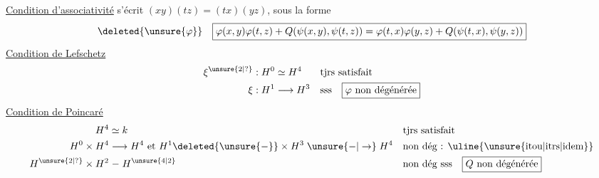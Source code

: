 \uline{Condition d'associativité} s'écrit $(xy)(tz)=(tx)(yz)$, sous la forme
\[
\deleted{\unsure{\varphi}}\quad
\boxed{\varphi(x,y)\varphi(t,z)+Q(\psi(x,y),\psi(t,z))=\varphi(t,x)\varphi(y,z)+Q(\psi(t,x),\psi(y,z))}
\]
\uline{Condition de Lefschetz}
\[
\begin{aligned}
\xi^{\unsure{2|?}}:H^0&\simeq H^4 &&\text{tjrs satisfait}\\
\xi:H^1&\longrightarrow H^3 &&\text{sss}\quad\boxed{\varphi\ \text{non dégénérée}}
\end{aligned}
\]
\uline{Condition de Poincaré}
\[
\begin{aligned}
H^4&\simeq k &&\text{tjrs satisfait}\\
H^0\times H^4&\longrightarrow H^4\ \text{et}\ H^1\deleted{\unsure{-}}\times H^3\mathrel{\unsure{-|\to}}H^4 &&\text{non dég : \uline{\unsure{itou|itrs|idem}}}\\
H^{\unsure{2|?}}\times H^2&\mathrel{-}H^{\unsure{4|2}} &&\text{non dég sss}\quad\boxed{Q\ \text{non dégénérée}}
\end{aligned}
\]
